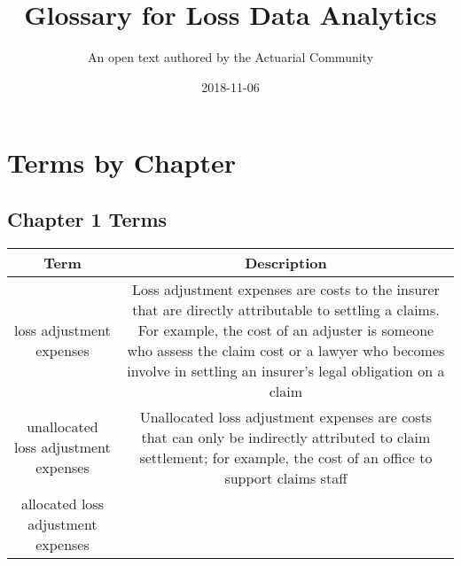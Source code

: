\documentclass[]{book}
\title{Glossary for Loss Data Analytics}
\author{An open text authored by the Actuarial Community}
\date{2018-11-06}
\theoremstyle{definition}
\theoremstyle{definition}
\theoremstyle{definition}
\theoremstyle{remark}
\begin{document}
\maketitle

{
\setcounter{tocdepth}{1}
\tableofcontents
}
\chapter{Terms by Chapter}\label{terms-by-chapter}

\section{Chapter 1 Terms}\label{chapter-1-terms}

\begin{longtable}[]{@{}cc@{}}
\toprule
\begin{minipage}[b]{0.39\columnwidth}\centering\strut
Term\strut
\end{minipage} & \begin{minipage}[b]{0.42\columnwidth}\centering\strut
Description\strut
\end{minipage}\tabularnewline
\midrule
\endhead
\begin{minipage}[t]{0.39\columnwidth}\centering\strut
loss adjustment expenses\strut
\end{minipage} & \begin{minipage}[t]{0.42\columnwidth}\centering\strut
Loss adjustment expenses are costs to the insurer that are directly
attributable to settling a claims. For example, the cost of an adjuster
is someone who assess the claim cost or a lawyer who becomes involve in
settling an insurer's legal obligation on a claim\strut
\end{minipage}\tabularnewline
\begin{minipage}[t]{0.39\columnwidth}\centering\strut
unallocated loss adjustment expenses\strut
\end{minipage} & \begin{minipage}[t]{0.42\columnwidth}\centering\strut
Unallocated loss adjustment expenses are costs that can only be
indirectly attributed to claim settlement; for example, the cost of an
office to support claims staff\strut
\end{minipage}\tabularnewline
\begin{minipage}[t]{0.39\columnwidth}\centering\strut
allocated loss adjustment expenses\strut
\end{minipage} & \begin{minipage}[t]{0.42\columnwidth}\centering\strut

\end{minipage}
\end{longtable}
\end{document}
